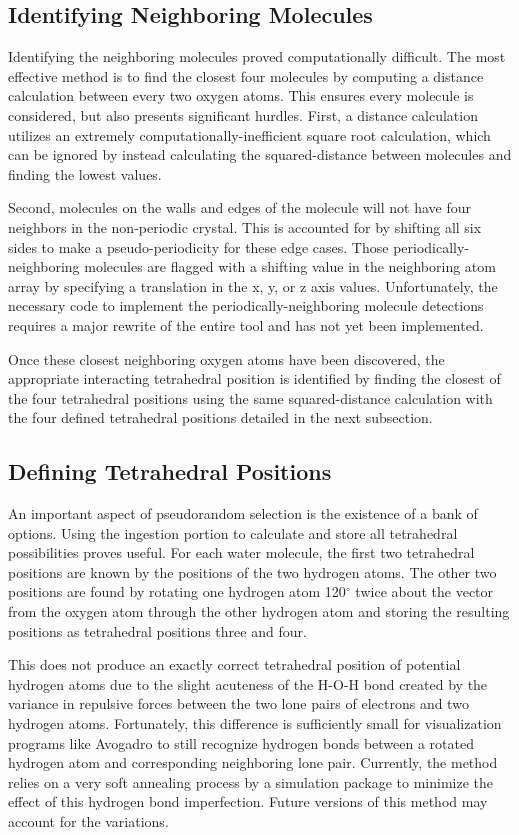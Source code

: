 \subsection{Identifying Neighboring Molecules}

Identifying the neighboring molecules proved computationally difficult. 
The most effective method is to find the closest four molecules by computing a distance calculation between every two oxygen atoms.
This ensures every molecule is considered, but also presents significant hurdles.
First, a distance calculation utilizes an extremely computationally-inefficient square root calculation, which can be ignored by instead calculating the squared-distance between molecules and finding the lowest values.

Second, molecules on the walls and edges of the molecule will not have four neighbors in the non-periodic crystal. 
This is accounted for by shifting all six sides to make a pseudo-periodicity for these edge cases. 
Those periodically-neighboring molecules are flagged with a shifting value in the neighboring atom array by specifying a translation in the x, y, or z axis values. 
Unfortunately, the necessary code to implement the periodically-neighboring molecule detections requires a major rewrite of the entire tool and has not yet been implemented.

Once these closest neighboring oxygen atoms have been discovered, the appropriate interacting tetrahedral position is identified by finding the closest of the four tetrahedral positions using the same squared-distance calculation with the four defined tetrahedral positions detailed in the next subsection.

\subsection{Defining Tetrahedral Positions}

An important aspect of pseudorandom selection is the existence of a bank of options. %
Using the ingestion portion to calculate and store all tetrahedral possibilities proves useful.
For each water molecule, the first two tetrahedral positions are known by the positions of the two hydrogen atoms. 
The other two positions are found by rotating one hydrogen atom 120$^{\circ}$ twice about the vector from the oxygen atom through the other hydrogen atom and storing the resulting positions as tetrahedral positions three and four. 

This does not produce an exactly correct tetrahedral position of potential hydrogen atoms due to the slight acuteness of the H-O-H bond created by the variance in repulsive forces between the two lone pairs of electrons and two hydrogen atoms. 
Fortunately, this difference is sufficiently small for visualization programs like Avogadro to still recognize hydrogen bonds between a rotated hydrogen atom and corresponding neighboring lone pair. 
Currently, the method relies on a very soft annealing process by a simulation package to minimize the effect of this hydrogen bond imperfection. 
Future versions of this method may account for the variations.

